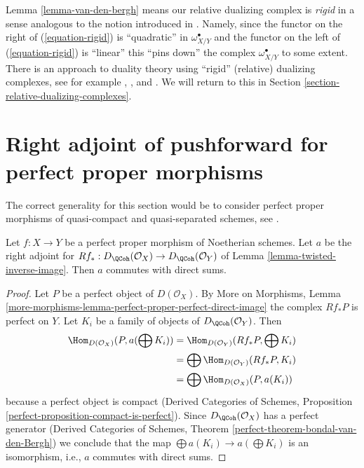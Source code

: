 \begin{remark}
\label{remark-van-den-bergh}
Lemma \ref{lemma-van-den-bergh} means our relative dualizing
complex is {\it rigid} in a sense analogous to the notion introduced
in \cite{vdB-rigid}. Namely, since the functor on the right of
(\ref{equation-rigid})
is ``quadratic'' in $\omega_{X/Y}^\bullet$ and the functor on the left
of (\ref{equation-rigid})
is ``linear'' this ``pins down'' the complex $\omega_{X/Y}^\bullet$
to some extent. There is an approach to duality theory using
``rigid'' (relative) dualizing complexes, see for example
\cite{Neeman-rigid}, \cite{Yekutieli-rigid}, and \cite{Yekutieli-Zhang}.
We will return to this in Section \ref{section-relative-dualizing-complexes}.
\end{remark}





\section{Right adjoint of pushforward for perfect proper morphisms}
\label{section-perfect-proper}

\noindent
The correct generality for this section would be to consider
perfect proper morphisms of quasi-compact and quasi-separated
schemes, see \cite{LN}.

\begin{lemma}
\label{lemma-proper-flat-noetherian}
Let $f : X \to Y$ be a perfect proper morphism of Noetherian schemes.
Let $a$ be the right adjoint for
$Rf_* : D_\QCoh(\mathcal{O}_X) \to D_\QCoh(\mathcal{O}_Y)$ of
Lemma \ref{lemma-twisted-inverse-image}. Then $a$ commutes with direct sums.
\end{lemma}

\begin{proof}
Let $P$ be a perfect object of $D(\mathcal{O}_X)$. By
More on Morphisms, Lemma
\ref{more-morphisms-lemma-perfect-proper-perfect-direct-image}
the complex $Rf_*P$ is perfect on $Y$.
Let $K_i$ be a family of objects of $D_\QCoh(\mathcal{O}_Y)$.
Then
\begin{align*}
\Hom_{D(\mathcal{O}_X)}(P, a(\bigoplus K_i))
& =
\Hom_{D(\mathcal{O}_Y)}(Rf_*P, \bigoplus K_i) \\
& =
\bigoplus \Hom_{D(\mathcal{O}_Y)}(Rf_*P, K_i) \\
& =
\bigoplus \Hom_{D(\mathcal{O}_X)}(P, a(K_i))
\end{align*}
because a perfect object is compact (Derived Categories of Schemes,
Proposition \ref{perfect-proposition-compact-is-perfect}).
Since $D_\QCoh(\mathcal{O}_X)$ has a perfect generator
(Derived Categories of Schemes, Theorem
\ref{perfect-theorem-bondal-van-den-Bergh})
we conclude that the map $\bigoplus a(K_i) \to a(\bigoplus K_i)$
is an isomorphism, i.e., $a$ commutes with direct sums.
\end{proof}

